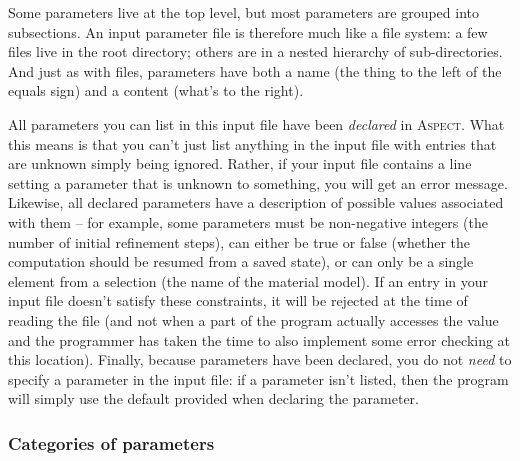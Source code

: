 \documentclass{article}
\newcommand{\aspect}{\textsc{Aspect}}
\begin{document}
Some parameters live at the top level, but most parameters are grouped into
subsections. An input parameter file is therefore much like a file system: a
few files live in the root directory; others are in a nested hierarchy of
sub-directories. And just as with files, parameters have both a name (the
thing to the left of the equals sign) and a content (what's to the right).

All parameters you can list in this input file have been \textit{declared} in
\aspect. What this means is that you can't just list anything in the input
file with entries that are unknown simply being ignored. Rather, if your input
file contains a line setting a parameter that is unknown to something, you
will get an error message. Likewise, all declared parameters have a
description of possible values associated with them -- for example, some
parameters must be non-negative integers (the number of initial refinement
steps), can either be true or false (whether the computation should be resumed
from a saved state), or can only be a single element from a selection (the
name of the material model). If an entry in your input file doesn't satisfy
these constraints, it will be rejected at the time of reading the file (and
not when a part of the program actually accesses the value and the programmer
has taken the time to also implement some error checking at this location).
Finally, because parameters have been declared, you do not \textit{need} to
specify a parameter in the input file: if a parameter isn't listed, then the
program will simply use the default provided when declaring the parameter.

\subsubsection{Categories of parameters}
\end{document}
